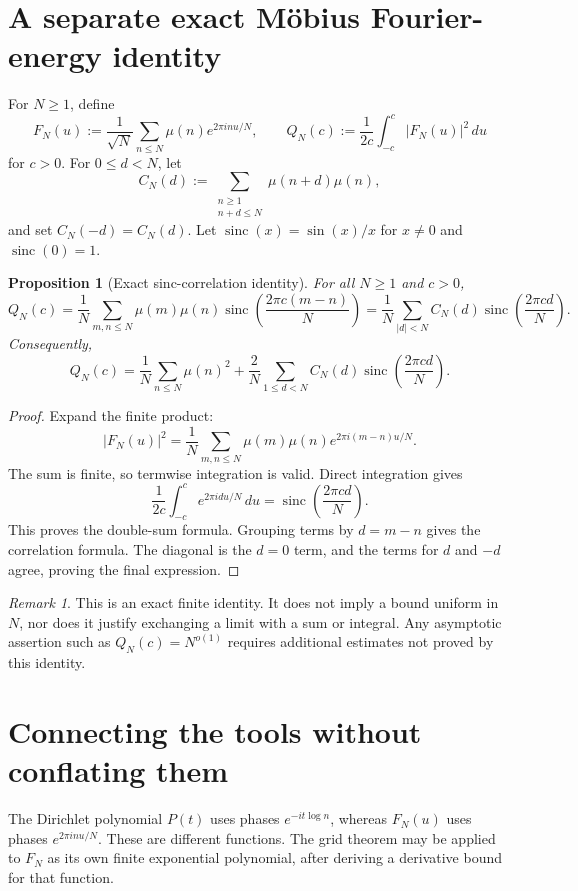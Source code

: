 \documentclass[11pt]{article}
\newtheorem{proposition}[theorem]{Proposition}
\theoremstyle{definition}\newtheorem{definition}[theorem]{Definition}
\theoremstyle{remark}\newtheorem{remark}[theorem]{Remark}
\begin{document}
\section{A separate exact Möbius Fourier-energy identity}
For $N\ge1$, define
\[
F_N(u):=\frac1{\sqrt N}\sum_{n\le N}\mu(n)e^{2\pi inu/N},\qquad
Q_N(c):=\frac1{2c}\int_{-c}^c|F_N(u)|^2\,du
\]
for $c>0$. For $0\le d<N$, let
\[
C_N(d):=\sum_{\substack{n\ge1\\n+d\le N}}\mu(n+d)\mu(n),
\]
and set $C_N(-d)=C_N(d)$. Let $\operatorname{sinc}(x)=\sin(x)/x$ for $x\ne0$ and $\operatorname{sinc}(0)=1$.
\begin{proposition}[Exact sinc-correlation identity]\label{prop:sinc}
For all $N\ge1$ and $c>0$,
\[
Q_N(c)=\frac1N\sum_{m,n\le N}\mu(m)\mu(n)
\operatorname{sinc}\!\left(\frac{2\pi c(m-n)}N\right)
=\frac1N\sum_{|d|<N}C_N(d)
\operatorname{sinc}\!\left(\frac{2\pi cd}N\right).
\]
Consequently,
\[
Q_N(c)=\frac1N\sum_{n\le N}\mu(n)^2+
\frac2N\sum_{1\le d<N}C_N(d)
\operatorname{sinc}\!\left(\frac{2\pi cd}N\right).
\]
\end{proposition}
\begin{proof}
Expand the finite product:
\[
|F_N(u)|^2=\frac1N\sum_{m,n\le N}\mu(m)\mu(n)e^{2\pi i(m-n)u/N}.
\]
The sum is finite, so termwise integration is valid. Direct integration gives
\[
\frac1{2c}\int_{-c}^c e^{2\pi i d u/N}\,du
=\operatorname{sinc}\!\left(\frac{2\pi cd}N\right).
\]
This proves the double-sum formula. Grouping terms by $d=m-n$ gives the correlation formula. The diagonal is the $d=0$ term, and the terms for $d$ and $-d$ agree, proving the final expression.
\end{proof}
\begin{remark}
This is an exact finite identity. It does not imply a bound uniform in $N$, nor does it justify exchanging a limit with a sum or integral. Any asymptotic assertion such as $Q_N(c)=N^{o(1)}$ requires additional estimates not proved by this identity.
\end{remark}

\section{Connecting the tools without conflating them}
The Dirichlet polynomial $P(t)$ uses phases $e^{-it\log n}$, whereas $F_N(u)$ uses phases $e^{2\pi inu/N}$. These are different functions. The grid theorem may be applied to $F_N$ as its own finite exponential polynomial, after deriving a derivative bound for that function.
\end{document}
